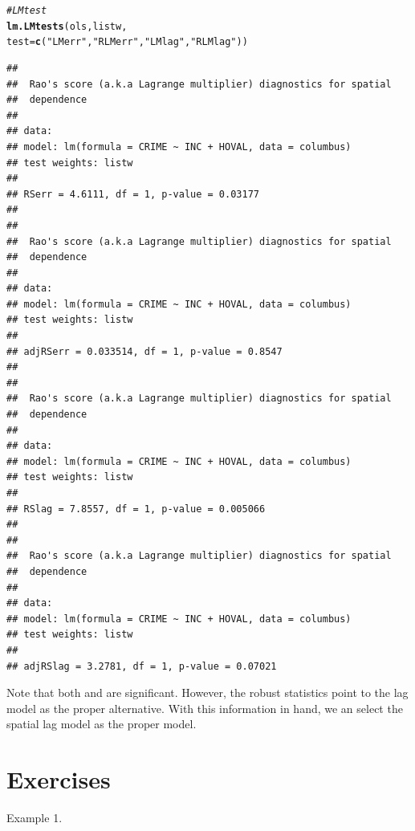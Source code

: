 \documentclass[english,12pt]{book}\usepackage[]{graphicx}\usepackage[]{xcolor}
\makeatletter
\newcommand{\hlsng}[1]{\textcolor[rgb]{0.192,0.494,0.8}{#1}}%
\newcommand{\hlcom}[1]{\textcolor[rgb]{0.678,0.584,0.686}{\textit{#1}}}%
\newcommand{\hldef}[1]{\textcolor[rgb]{0.345,0.345,0.345}{#1}}%
\newcommand{\hlkwc}[1]{\textcolor[rgb]{0.333,0.667,0.333}{#1}}%
\newcommand{\hlkwd}[1]{\textcolor[rgb]{0.737,0.353,0.396}{\textbf{#1}}}%
\newenvironment{kframe}{%
 \def\at@end@of@kframe{}%
 \ifinner\ifhmode%
  \def\at@end@of@kframe{\end{minipage}}%
  \begin{minipage}{\columnwidth}%
 \fi\fi%
 \def\FrameCommand##1{\hskip\@totalleftmargin \hskip-\fboxsep
 \colorbox{shadecolor}{##1}\hskip-\fboxsep
     \hskip-\linewidth \hskip-\@totalleftmargin \hskip\columnwidth}%
 \MakeFramed {\advance\hsize-\width
   \@totalleftmargin\z@ \linewidth\hsize
   \@setminipage}}%
 {\par\unskip\endMakeFramed%
 \at@end@of@kframe}
\newenvironment{knitrout}{}{} %
\makeatother
\begin{document}
\begin{knitrout}
\color{fgcolor}\begin{kframe}
\begin{alltt}
\hlcom{# LM test}
\hlkwd{lm.LMtests}\hldef{(ols, listw,}
           \hlkwc{test} \hldef{=} \hlkwd{c}\hldef{(}\hlsng{"LMerr"}\hldef{,} \hlsng{"RLMerr"}\hldef{,} \hlsng{"LMlag"}\hldef{,} \hlsng{"RLMlag"}\hldef{))}
\end{alltt}


{\ttfamily\noindent\itshape\color{messagecolor}{\#\# Please update scripts to use lm.RStests in place of lm.LMtests}}\begin{verbatim}
## 
## 	Rao's score (a.k.a Lagrange multiplier) diagnostics for spatial
## 	dependence
## 
## data:  
## model: lm(formula = CRIME ~ INC + HOVAL, data = columbus)
## test weights: listw
## 
## RSerr = 4.6111, df = 1, p-value = 0.03177
## 
## 
## 	Rao's score (a.k.a Lagrange multiplier) diagnostics for spatial
## 	dependence
## 
## data:  
## model: lm(formula = CRIME ~ INC + HOVAL, data = columbus)
## test weights: listw
## 
## adjRSerr = 0.033514, df = 1, p-value = 0.8547
## 
## 
## 	Rao's score (a.k.a Lagrange multiplier) diagnostics for spatial
## 	dependence
## 
## data:  
## model: lm(formula = CRIME ~ INC + HOVAL, data = columbus)
## test weights: listw
## 
## RSlag = 7.8557, df = 1, p-value = 0.005066
## 
## 
## 	Rao's score (a.k.a Lagrange multiplier) diagnostics for spatial
## 	dependence
## 
## data:  
## model: lm(formula = CRIME ~ INC + HOVAL, data = columbus)
## test weights: listw
## 
## adjRSlag = 3.2781, df = 1, p-value = 0.07021
\end{verbatim}
\end{kframe}
\end{knitrout}

Note that both  and  are significant. However, the robust statistics point to the lag model as the proper alternative. With this information in hand, we an select the spatial lag model as the proper model. 

\section{Exercises}

\begin{exercises}
    \exercise Example 1. 
\end{exercises}    
    
\end{document}
